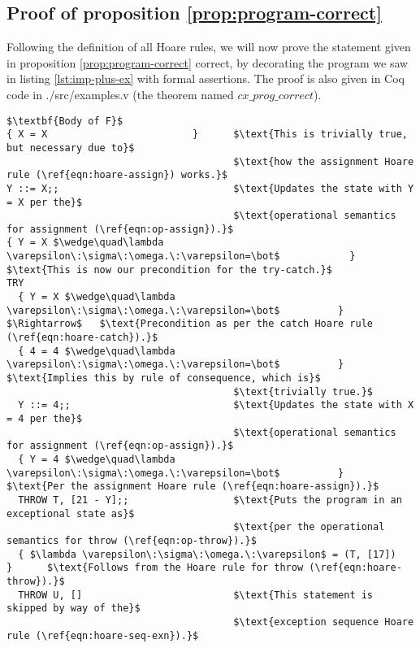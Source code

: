 \subsection{Proof of proposition \ref{prop:program-correct}}

Following the definition of all Hoare rules, we will now prove the statement given in proposition \ref{prop:program-correct} correct, by decorating the program we saw in listing \ref{lst:imp-plus-ex} with formal assertions. The proof is also given in Coq code in ./src/examples.v (the theorem named $cx\_prog\_correct$).

\begin{lstlisting}[mathescape=true,keepspaces=true,label=lst:hoare_ex_asgn,caption=Decorated variant of the program from listing \ref{lst:imp-plus-ex}.]
$\textbf{Body of F}$
{ X = X                         }      $\text{This is trivially true, but necessary due to}$
                                       $\text{how the assignment Hoare rule (\ref{eqn:hoare-assign}) works.}$
Y ::= X;;                              $\text{Updates the state with Y = X per the}$
                                       $\text{operational semantics for assignment (\ref{eqn:op-assign}).}$
{ Y = X $\wedge\quad\lambda \varepsilon\:\sigma\:\omega.\:\varepsilon=\bot$            }      $\text{This is now our precondition for the try-catch.}$
TRY
  { Y = X $\wedge\quad\lambda \varepsilon\:\sigma\:\omega.\:\varepsilon=\bot$          } $\Rightarrow$   $\text{Precondition as per the catch Hoare rule (\ref{eqn:hoare-catch}).}$
  { 4 = 4 $\wedge\quad\lambda \varepsilon\:\sigma\:\omega.\:\varepsilon=\bot$          }      $\text{Implies this by rule of consequence, which is}$
                                       $\text{trivially true.}$
  Y ::= 4;;                            $\text{Updates the state with X = 4 per the}$
                                       $\text{operational semantics for assignment (\ref{eqn:op-assign}).}$
  { Y = 4 $\wedge\quad\lambda \varepsilon\:\sigma\:\omega.\:\varepsilon=\bot$          }      $\text{Per the assignment Hoare rule (\ref{eqn:hoare-assign}).}$
  THROW T, [21 - Y];;                  $\text{Puts the program in an exceptional state as}$
                                       $\text{per the operational semantics for throw (\ref{eqn:op-throw}).}$
  { $\lambda \varepsilon\:\sigma\:\omega.\:\varepsilon$ = (T, [17])          }      $\text{Follows from the Hoare rule for throw (\ref{eqn:hoare-throw}).}$
  THROW U, []                          $\text{This statement is skipped by way of the}$
                                       $\text{exception sequence Hoare rule (\ref{eqn:hoare-seq-exn}).}$

\end{lstlisting}
